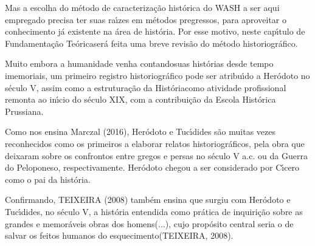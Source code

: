 \documentclass[
12pt,		%
openright,	%
twoside,  %
a4paper,			%
chapter=TITLE,		%
english,			%
french,				%
spanish,			%
brazil				%
]{USPSC-classe/USPSC}
\begin{document}
Mas a escolha do m\'etodo de caracteriza\c{c}\~ao hist\'orica do WASH a ser aqui empregado precisa ter suas ra\'{\i}zes em m\'etodos pregressos, para aproveitar o conhecimento j\'a existente na \'area de hist\'oria. Por esse motivo, neste cap\'{\i}tulo de \textquotedbl Fundamenta\c{c}\~ao Te\'orica\textquotedbl  ser\'a feita uma breve revis\~ao do m\'etodo historiogr\'afico.

















Muito embora a humanidade venha \textquotedbl contando\textquotedbl  suas hist\'orias desde tempo imemoriais, um primeiro registro historiogr\'afico pode ser atribu\'{\i}do a Her\'odoto no s\'eculo V, assim como a estrutura\c{c}\~ao da \textquotedbl Hist\'oria\textquotedbl  como atividade profissional remonta ao in\'{\i}cio do s\'eculo XIX, com a contribui\c{c}\~ao da Escola Hist\'orica Prussiana.

















Como nos ensina  Marczal (2016),  Her\'odoto e Tuc\'{\i}dides s\~ao muitas vezes reconhecidos como os primeiros a elaborar relatos historiogr\'aficos, pela obra que deixaram sobre os confrontos entre gregos e persas no s\'eculo V a.c. ou da Guerra do Peloponeso, respectivamente. Her\'odoto chegou a ser considerado por C\'{\i}cero como o \textquotedbl pai da hist\'oria\textquotedbl .

















Confirmando, TEIXEIRA (2008)  tamb\'em ensina que surgiu com Her\'odoto e Tuc\'{\i}dides, no s\'eculo V, a hist\'oria \textquotedbl entendida como pr\'atica de inquiri\c{c}\~ao sobre as grandes e memor\'aveis obras dos homens(...), cujo prop\'osito central seria o de salvar os feitos humanos do esquecimento\textquotedbl   (TEIXEIRA, 2008).
\end{document}
